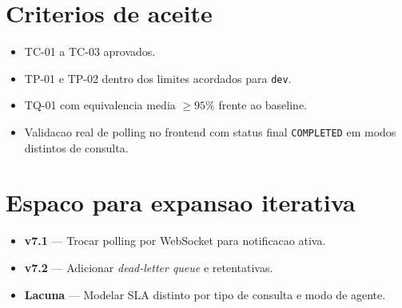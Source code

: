 \section{Criterios de aceite}

\begin{itemize}[leftmargin=*]
  \item TC-01 a TC-03 aprovados.
  \item TP-01 e TP-02 dentro dos limites acordados para \texttt{dev}.
  \item TQ-01 com equivalencia media $\geq 95\%$ frente ao baseline.
  \item Validacao real de polling no frontend com status final
        \texttt{COMPLETED} em modos distintos de consulta.
\end{itemize}

\section{Espaco para expansao iterativa}

\begin{itemize}[leftmargin=*]
  \item \textbf{v7.1} --- Trocar polling por WebSocket para notificacao ativa.
  \item \textbf{v7.2} --- Adicionar \textit{dead-letter queue} e retentativas.
  \item \textbf{Lacuna} --- Modelar SLA distinto por tipo de consulta e modo de agente.
\end{itemize}
